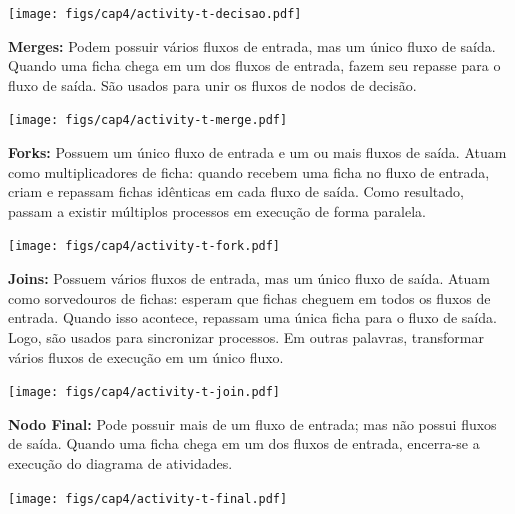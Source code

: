 \documentclass[
  11pt,
  twoside]{book}
\begin{document}
\texttt{[image: figs/cap4/activity-t-decisao.pdf]}

\textbf{Merges:} Podem possuir vários fluxos de entrada, mas um único
fluxo de saída. Quando uma ficha chega em um dos fluxos de entrada,
fazem seu repasse para o fluxo de saída. São usados para unir os fluxos
de nodos de decisão.

\texttt{[image: figs/cap4/activity-t-merge.pdf]}

\textbf{Forks:} Possuem um único fluxo de entrada e um ou mais fluxos de
saída. Atuam como multiplicadores de ficha: quando recebem uma ficha no
fluxo de entrada, criam e repassam fichas idênticas em cada fluxo de
saída. Como resultado, passam a existir múltiplos processos em execução
de forma paralela.

\texttt{[image: figs/cap4/activity-t-fork.pdf]}

\textbf{Joins:} Possuem vários fluxos de entrada, mas um único fluxo de
saída. Atuam como sorvedouros de fichas: esperam que fichas cheguem em
todos os fluxos de entrada. Quando isso acontece, repassam uma única
ficha para o fluxo de saída. Logo, são usados para sincronizar
processos. Em outras palavras, transformar vários fluxos de execução em
um único fluxo.

\texttt{[image: figs/cap4/activity-t-join.pdf]}

\textbf{Nodo Final:} Pode possuir mais de um fluxo de entrada; mas não
possui fluxos de saída. Quando uma ficha chega em um dos fluxos de
entrada, encerra-se a execução do diagrama de atividades.

\texttt{[image: figs/cap4/activity-t-final.pdf]}
\end{document}
